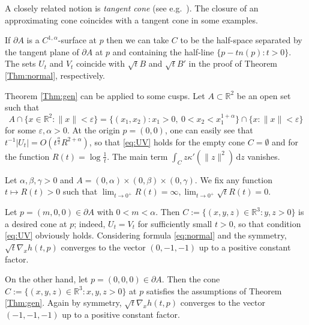 \documentclass[graybox]{svmult}
\newcommand{\ep}{\varepsilon}
\renewcommand{\d}{\mathrm{d}}  %
\newcommand{\R}{\mathbb{R}}  %
\renewcommand{\AA}{A}  %
\newcommand{\pp}{p}
\begin{document}
\begin{remark} A closely related notion is \emph{tangent cone} (see e.g.~\cite{Mo}). 
The closure of an approximating cone coincides with a tangent cone in some examples. 
\end{remark}

\begin{example} \label{ex:normal} If $\partial \AA$ is a $C^{1,\alpha}$-surface at $\pp$ then we can take $C$ to be the half-space separated by the tangent plane of $\partial\AA$ at $\pp$ and  containing the half-line $\{\pp - t n(\pp): t>0\}$. The sets $U_t$ and $V_t$ coincide with $\sqrt{t}B$ and $\sqrt{t}B'$ in the proof of Theorem \ref{Thm:normal}, respectively. 
\end{example}

\begin{example}[Cusps]
Theorem \ref{Thm:gen} can be applied to some cusps.  Let $ \AA \subset \R^2$ be an open set such that 
\[
\AA \cap \{x \in \R^2: \|x\|<\ep\} = \{(x_1,x_2):  x_1>0, ~0<x_2 < x_1^{1+\alpha}\}  \cap \{x: \|x\|<\ep\}
\] 
for some $\ep,\alpha>0$. At the origin $p=(0,0)$, one can easily see that $t^{-1}|U_t| =O(t^{\frac{\alpha}{2}}R^{2+\alpha})$, so that \eqref{eq:UV} holds for the empty cone $C=\emptyset$ and for the function $R(t) = \log\frac1{t}$. The main term $\int_{C} z \kappa'(\|z  \|^2) \,\d z$ vanishes. 

\end{example}

\begin{example}  \label{ex_rectangular}
Let $\alpha,\beta,\gamma>0$ and $\AA = (0,\alpha) \times (0,\beta) \times (0,\gamma)$. We fix any function $t\mapsto R(t)>0$  such that $\lim_{t\to0^+}R(t)=\infty, \lim_{t\to0^+}\sqrt{t}R(t)=0$. 

Let $\pp =(m,0,0) \in \partial \AA$ with $0<m<\alpha$. Then $C :=\{(x,y,z) \in \R^3: y,z>0\}$ is a desired cone at $\pp$; indeed, $U_t = V_t$ for sufficiently small $t>0$, so that condition \eqref{eq:UV} obviously holds. Considering formula \eqref{eq:normal} and the symmetry, $\sqrt{t}\nabla_x h(t,\pp)$ converges to the vector $(0,-1,-1)$ up to a positive constant factor. 

On the other hand, let $\pp=(0,0,0)\in \partial \AA$. Then the cone $C :=\{(x,y,z) \in \R^3: x, y,z>0\}$ at $\pp$ satisfies the assumptions of Theorem \ref{Thm:gen}. Again by symmetry, $\sqrt{t}\nabla_x h(t,\pp)$ converges to the vector $(-1,-1,-1)$ up to a positive constant factor. 
\end{example}
\end{document}
